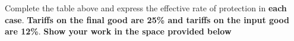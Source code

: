 \documentclass[12pt]{exam}
\begin{document}
\begin{questions}
\newpage 



\question[10]
Complete the table above and express the effective rate of protection in \textbf{each case}. 
\textbf{Tariffs on the final good are 25\% and tariffs on the input good are 12\%}.
\textbf{Show your work in the space provided below}


\end{questions}
\end{document}
